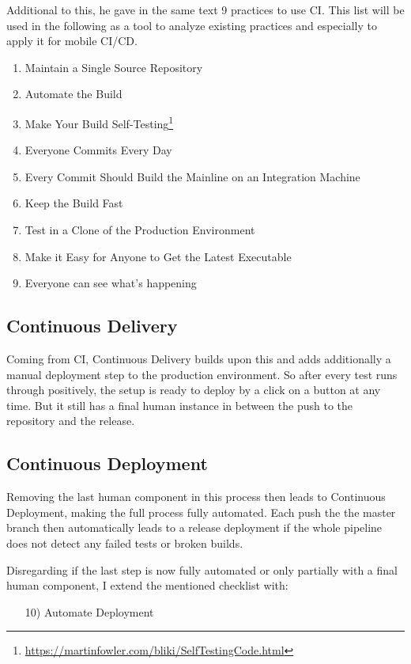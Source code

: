 Additional to this, he gave in the same text 9 practices to use CI. This list will be used in the following as a tool to analyze existing practices and especially to apply it for mobile CI/CD. 

\begin{enumerate}
	\item Maintain a Single Source Repository
	\item Automate the Build
	\item Make Your Build Self-Testing\footnote{\url{https://martinfowler.com/bliki/SelfTestingCode.html}}
	\item Everyone Commits Every Day
	\item Every Commit Should Build the Mainline on an Integration Machine
	\item Keep the Build Fast
	\item Test in a Clone of the Production Environment
	\item Make it Easy for Anyone to Get the Latest Executable
	\item Everyone can see what's happening
\end{enumerate}

\subsection{Continuous Delivery}

Coming from CI, Continuous Delivery builds upon this and adds additionally a manual deployment step to the production environment. So after every test runs through positively, the setup is ready to deploy by a click on a button at any time. But it still has a final human instance in between the push to the repository and the release.

\subsection{Continuous Deployment}

Removing the last human component in this process then leads to Continuous Deployment, making the full process fully automated. Each push the the master branch then automatically leads to a release deployment if the whole pipeline does not detect any failed tests or broken builds.

Disregarding if the last step is now fully automated or only partially with a final human component, I extend the mentioned checklist with:

\begin{enumerate}
	\item[10)] Automate Deployment
\end{enumerate}
